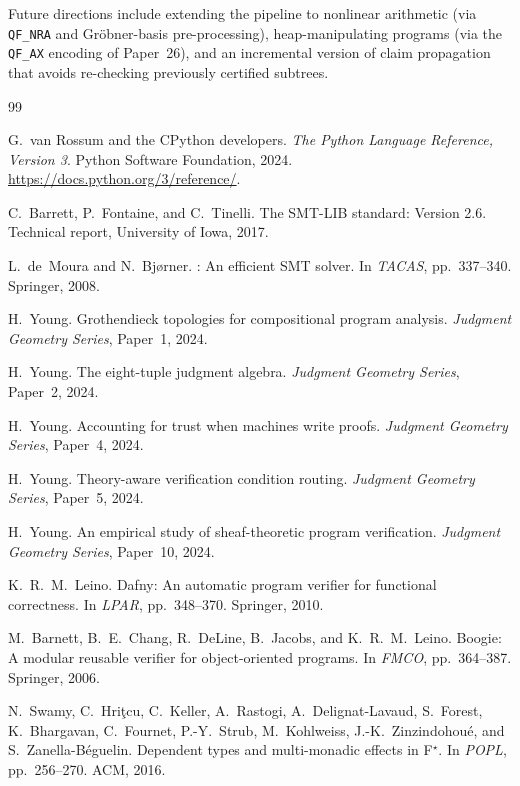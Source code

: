 \documentclass[11pt]{article}
\begin{document}
Future directions include extending the pipeline to nonlinear
arithmetic (via \texttt{QF\_NRA} and Gröbner-basis
pre-processing), heap-manipulating programs (via the
\texttt{QF\_AX} encoding of Paper~26), and an incremental
version of claim propagation that avoids re-checking
previously certified subtrees.

\begin{thebibliography}{99}

G.~van Rossum and the CPython developers.
\newblock \emph{The Python Language Reference, Version 3}.
\newblock Python Software Foundation, 2024.
\newblock \url{https://docs.python.org/3/reference/}.

C.~Barrett, P.~Fontaine, and C.~Tinelli.
\newblock The {SMT-LIB} standard: Version 2.6.
\newblock Technical report, University of Iowa, 2017.

L.~de~Moura and N.~Bj{\o}rner.
: An efficient {SMT} solver.
\newblock In \emph{TACAS}, pp.~337--340. Springer, 2008.

H.~Young.
\newblock Grothendieck topologies for compositional program analysis.
\newblock \emph{Judgment Geometry Series}, Paper~1, 2024.

H.~Young.
\newblock The eight-tuple judgment algebra.
\newblock \emph{Judgment Geometry Series}, Paper~2, 2024.

H.~Young.
\newblock Accounting for trust when machines write proofs.
\newblock \emph{Judgment Geometry Series}, Paper~4, 2024.

H.~Young.
\newblock Theory-aware verification condition routing.
\newblock \emph{Judgment Geometry Series}, Paper~5, 2024.

H.~Young.
\newblock An empirical study of sheaf-theoretic program verification.
\newblock \emph{Judgment Geometry Series}, Paper~10, 2024.

K.~R.~M.~Leino.
\newblock Dafny: An automatic program verifier for functional correctness.
\newblock In \emph{LPAR}, pp.~348--370. Springer, 2010.

M.~Barnett, B.~E.~Chang, R.~DeLine, B.~Jacobs, and K.~R.~M.~Leino.
\newblock Boogie: A modular reusable verifier for object-oriented programs.
\newblock In \emph{FMCO}, pp.~364--387. Springer, 2006.

N.~Swamy, C.~Hri{\c{t}}cu, C.~Keller, A.~Rastogi, A.~Delignat-Lavaud,
  S.~Forest, K.~Bhargavan, C.~Fournet, P.-Y.~Strub, M.~Kohlweiss,
  J.-K.~Zinzindohoué, and S.~Zanella-Béguelin.
\newblock Dependent types and multi-monadic effects in {F$^\star$}.
\newblock In \emph{POPL}, pp.~256--270. ACM, 2016.


\end{thebibliography}
\end{document}
